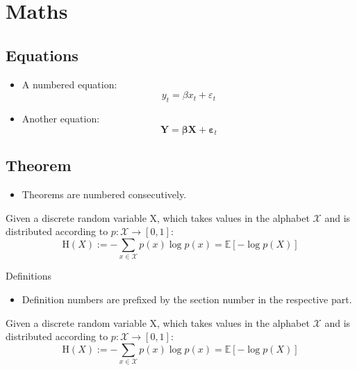 \section{Maths}
\subsection{Equations}
\begin{frame}
    \begin{itemize}
        \item A numbered equation:
        \begin{equation}
            y_t = \beta x_t + \varepsilon_t
        \end{equation}
         \item Another equation:
        \begin{equation*}
            \mathbf{Y} = \boldsymbol{\beta} \mathbf{X} + \boldsymbol{\varepsilon}_t
        \end{equation*}
    \end{itemize}
\end{frame}

\subsection{Theorem}
\begin{frame}
    \begin{itemize}
        \item Theorems are numbered consecutively.
    \end{itemize}
    \begin{theorem}
         Given a discrete random variable X, which takes values in the alphabet $\mathcal{X}$ and is distributed according to  $p:{\mathcal {X}}\to [0,1]$:
            \begin{equation}
                \mathrm {H} (X):=-\sum _{x\in {\mathcal {X}}}p(x)\log p(x)=\mathbb {E} [-\log p(X)]
            \end{equation}
    \end{theorem}
\end{frame}

\begin{frame}{}{Definitions}
    \begin{itemize}
        \item Definition numbers are prefixed by the section number in the respective part.
    \end{itemize}
     \begin{definition}
         Given a discrete random variable X, which takes values in the alphabet $\mathcal{X}$ and is distributed according to  $p:{\mathcal {X}}\to [0,1]$:
            \begin{equation}
                \mathrm {H} (X):=-\sum _{x\in {\mathcal {X}}}p(x)\log p(x)=\mathbb {E} [-\log p(X)]
            \end{equation}
    \end{definition}
\end{frame}

